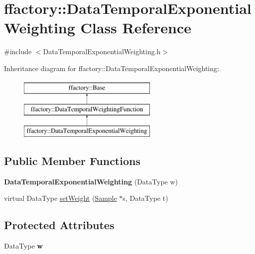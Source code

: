 \hypertarget{classffactory_1_1_data_temporal_exponential_weighting}{\section{ffactory\-:\-:Data\-Temporal\-Exponential\-Weighting Class Reference}
\label{classffactory_1_1_data_temporal_exponential_weighting}
}


{\ttfamily \#include $<$Data\-Temporal\-Exponential\-Weighting.\-h$>$}

Inheritance diagram for ffactory\-:\-:Data\-Temporal\-Exponential\-Weighting\-:\begin{figure}[H]
\begin{center}
\leavevmode
\includegraphics[height=3.000000cm]{classffactory_1_1_data_temporal_exponential_weighting}
\end{center}
\end{figure}
\subsection*{Public Member Functions}
\begin{DoxyCompactItemize}
\item 
\hypertarget{classffactory_1_1_data_temporal_exponential_weighting_a7442853330f60976df9ae1fcdb37b528}{{\bfseries Data\-Temporal\-Exponential\-Weighting} (Data\-Type w)}\label{classffactory_1_1_data_temporal_exponential_weighting_a7442853330f60976df9ae1fcdb37b528}

\item 
virtual Data\-Type \hyperlink{classffactory_1_1_data_temporal_exponential_weighting_a975d766ef91e42aa5e323160749e045e}{set\-Weight} (\hyperlink{classffactory_1_1_sample}{Sample} $\ast$s, Data\-Type t)
\end{DoxyCompactItemize}
\subsection*{Protected Attributes}
\begin{DoxyCompactItemize}
\item 
\hypertarget{classffactory_1_1_data_temporal_exponential_weighting_ae239749dcae99777ae11a07be072937c}{Data\-Type {\bfseries w}}\label{classffactory_1_1_data_temporal_exponential_weighting_ae239749dcae99777ae11a07be072937c}

\end{DoxyCompactItemize}


